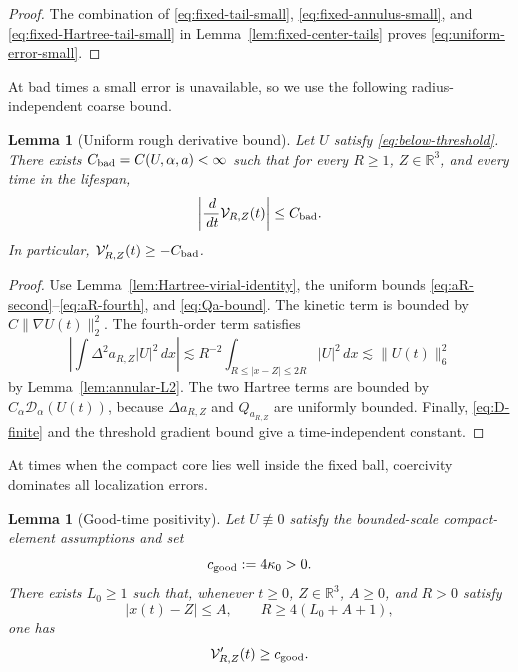 \documentclass[preprint,12pt]{elsarticle}
\numberwithin{equation}{section}
\newtheorem{lemma}[theorem]{Lemma}
\theoremstyle{remark}
\newcommand{\R}{\mathbb R}
\newcommand{\dd}{\,d}
\newcommand{\Dcal}{\mathcal D_{\alpha}}
\newcommand{\Vcal}{\mathcal V}
\begin{document}
\begin{proof}
The combination of \eqref{eq:fixed-tail-small}, \eqref{eq:fixed-annulus-small}, and \eqref{eq:fixed-Hartree-tail-small} in Lemma~\ref{lem:fixed-center-tails} proves \eqref{eq:uniform-error-small}.
\end{proof}


At bad times a small error is unavailable, so we use the following radius-independent coarse bound.

\begin{lemma}[Uniform rough derivative bound]\label{lem:rough-virial-bound}
Let $U$ satisfy \eqref{eq:below-threshold}. There exists $C_{\rm bad}=C(U,\alpha,a)<\infty$ such that for every $R\ge1$, $Z\in\R^3$, and every time in the lifespan,
\begin{equation}\label{eq:rough-virial-bound}
  \left|\frac{\dd}{\dd t}\Vcal_{R,Z}(t)\right|\le C_{\rm bad}.
\end{equation}
In particular, $\Vcal_{R,Z}'(t)\ge-C_{\rm bad}$.
\end{lemma}

\begin{proof}
Use Lemma~\ref{lem:Hartree-virial-identity}, the uniform bounds \eqref{eq:aR-second}--\eqref{eq:aR-fourth}, and \eqref{eq:Qa-bound}. The kinetic term is bounded by $C\|\nabla U(t)\|_2^2$. The fourth-order term satisfies
\[
  \left|\int\Delta^2a_{R,Z}|U|^2\dd x\right|
  \lesssim R^{-2}\int_{R\le|x-Z|\le2R}|U|^2\dd x
  \lesssim\|U(t)\|_6^2
\]
by Lemma~\ref{lem:annular-L2}. The two Hartree terms are bounded by $C_\alpha\Dcal(U(t))$, because $\Delta a_{R,Z}$ and $Q_{a_{R,Z}}$ are uniformly bounded. Finally, \eqref{eq:D-finite} and the threshold gradient bound give a time-independent constant.
\end{proof}

At times when the compact core lies well inside the fixed ball, coercivity dominates all localization errors.

\begin{lemma}[Good-time positivity]\label{lem:good-time-positivity}
Let $U\not\equiv0$ satisfy the bounded-scale compact-element assumptions and set
\begin{equation*}
  c_{\rm good}:=4\kappa_0>0.
\end{equation*}
There exists $L_0\ge1$ such that, whenever $t\ge0$, $Z\in\R^3$, $A\ge0$, and $R>0$ satisfy
\begin{equation}\label{eq:good-time-geometry}
  |x(t)-Z|\le A,
  \qquad
  R\ge4(L_0+A+1),
\end{equation}
one has
\begin{equation}\label{eq:good-time-derivative}
  \Vcal_{R,Z}'(t)\ge c_{\rm good}.
\end{equation}
\end{lemma}
\end{document}
